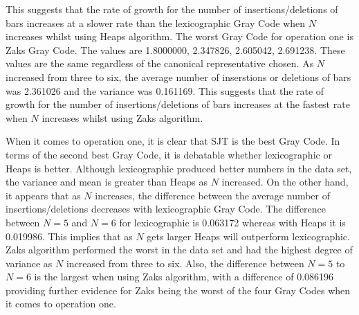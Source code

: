 This suggests that the rate of growth for the number of insertions/deletions of bars increases at a slower rate than the lexicographic Gray Code 
when $N$ increases whilst using Heaps algorithm. The worst Gray Code for operation one 
is Zaks Gray Code. The values are 1.8000000, 2.347826, 2.605042, 2.691238. These values 
are the same regardless of the canonical representative chosen. As $N$ increased from three to six, 
the average number of inserstions or deletions of bars was 2.361026 and the variance was 0.161169.
This suggests that the rate of growth for the number of insertions/deletions of bars increases at the fastest rate 
when $N$ increases whilst using Zaks algorithm.\par 
When it comes to operation one, it is clear that SJT is the best Gray Code. In terms of the second best Gray Code, 
it is debatable whether lexicographic or Heaps is better. Although lexicographic produced better numbers in the data set, the variance and mean is greater than Heaps as $N$ increased. 
On the other hand, it appears that as $N$ increases, the difference between the average number of insertions/deletions decreases with lexicographic Gray Code. The difference 
between $N=5$ and $N=6$ for lexicographic is 0.063172 whereas with Heaps it is 0.019986. This implies that as $N$ gets larger 
Heaps will outperform lexicographic. Zaks algorithm performed the worst in the data set and had the highest 
degree of variance as $N$ increased from three to six. Also, the difference between $N=5$ to $N=6$ is the largest 
when using Zaks algorithm, with a difference of 0.086196 providing further evidence for Zaks being the worst of the four Gray Codes when it comes to 
operation one.  
